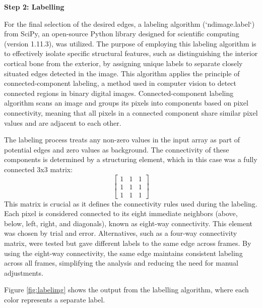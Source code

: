 \documentclass{micro-econ-thesis}
\begin{document}
\textbf{Step 2: Labelling}

For the final selection of the desired edges, a labeling algorithm (`ndimage.label`) from SciPy, an open-source Python library designed for scientific computing (version 1.11.3), was utilized. The purpose of employing this labeling algorithm is to effectively isolate specific structural features, such as distinguishing the interior cortical bone from the exterior, by assigning unique labels to separate closely situated edges detected in the image. This algorithm applies the principle of connected-component labeling,  a method used in computer vision to detect connected regions in binary digital images. Connected-component labeling algorithm scans an image and groups its pixels into components based on pixel connectivity, meaning that all pixels in a connected component share similar pixel values and are adjacent to each other.

The labeling process treats any non-zero values in the input array as part of potential edges and zero values as background. The connectivity of these components is determined by a structuring element, which in this case was a fully connected 3x3 matrix:
$$
\begin{bmatrix}
	1 & 1 & 1 \\
	1 & 1 & 1 \\
	1 & 1 & 1
\end{bmatrix}
$$
This matrix is crucial as it defines the connectivity rules used during the labeling. Each pixel is considered connected to its eight immediate neighbors (above, below, left, right, and diagonals), known as eight-way connectivity. This element was chosen by trial and error. Alternatives, such as a four-way connectivity matrix, were tested but gave different labels to the same edge across frames. By using the eight-way connectivity, the same edge maintains consistent labeling across all frames, simplifying the analysis and reducing the need for manual adjustments. 

Figure \ref{fig:labelimg} shows the output from the labelling algorithm, where each color represents a separate label. 
\end{document}
